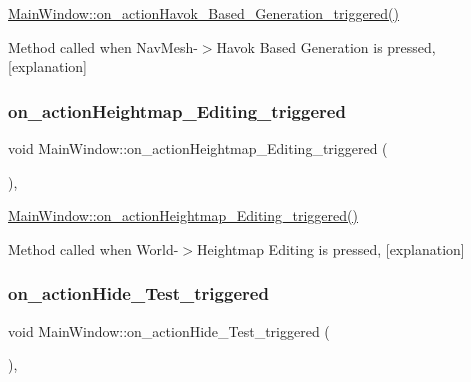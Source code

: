\hyperlink{class_main_window_acce573c1ebbc822a6008c05377a4f431}{Main\+Window\+::on\+\_\+action\+Havok\+\_\+\+Based\+\_\+\+Generation\+\_\+triggered()} 

Method called when Nav\+Mesh-\/$>$Havok Based Generation is pressed, \mbox{[}explanation\mbox{]} \mbox{\label{class_main_window_a5a0e9a546c0ccf99df38eabe7a51bcf9}} 
\subsubsection{\texorpdfstring{on\+\_\+action\+Heightmap\+\_\+\+Editing\+\_\+triggered}{on\_actionHeightmap\_Editing\_triggered}}
{\footnotesize\ttfamily void Main\+Window\+::on\+\_\+action\+Heightmap\+\_\+\+Editing\+\_\+triggered (\begin{DoxyParamCaption}{ }\end{DoxyParamCaption})\hspace{0.3cm}{\ttfamily [private]}, {\ttfamily [slot]}}



\hyperlink{class_main_window_a5a0e9a546c0ccf99df38eabe7a51bcf9}{Main\+Window\+::on\+\_\+action\+Heightmap\+\_\+\+Editing\+\_\+triggered()} 

Method called when World-\/$>$Heightmap Editing is pressed, \mbox{[}explanation\mbox{]} \mbox{\label{class_main_window_ac7fa56ba40ceb9eabb87920a65ff78d8}} 
\subsubsection{\texorpdfstring{on\+\_\+action\+Hide\+\_\+\+Test\+\_\+triggered}{on\_actionHide\_Test\_triggered}}
{\footnotesize\ttfamily void Main\+Window\+::on\+\_\+action\+Hide\+\_\+\+Test\+\_\+triggered (\begin{DoxyParamCaption}{ }\end{DoxyParamCaption})\hspace{0.3cm}{\ttfamily [private]}, {\ttfamily [slot]}}



